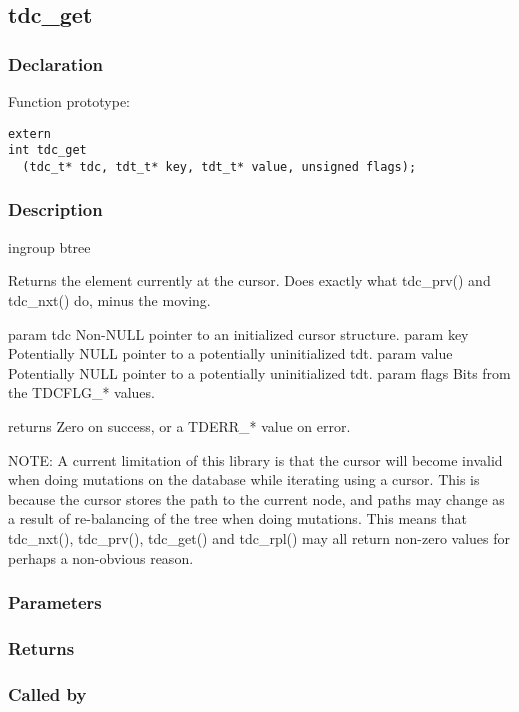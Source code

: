 
\newpage
\subsection{tdc\_get}
\subsubsection{Declaration} Function prototype:

\begin{verbatim}
extern
int tdc_get
  (tdc_t* tdc, tdt_t* key, tdt_t* value, unsigned flags);
\end{verbatim}

\subsubsection{Description}


 ingroup btree

 Returns the element currently at the cursor.
 Does exactly what tdc\_prv() and tdc\_nxt() do, minus the moving.

 param tdc Non-NULL pointer to an initialized cursor structure.
 param key Potentially NULL pointer to a potentially uninitialized tdt.
 param value Potentially NULL pointer to a potentially uninitialized tdt.
 param flags Bits from the TDCFLG\_* values.

 returns Zero on success, or a TDERR\_* value on error.

 NOTE: A current limitation of this library is that the cursor will
 become invalid when doing mutations on the database while iterating
 using a cursor. This is because the cursor stores the path to the
 current node, and paths may change as a result of re-balancing of
 the tree when doing mutations. This means that tdc\_nxt(), tdc\_prv(),
 tdc\_get() and tdc\_rpl() may all return non-zero values for perhaps
 a non-obvious reason.

 

\subsubsection{Parameters}
\subsubsection{Returns}
\subsubsection{Called by}
